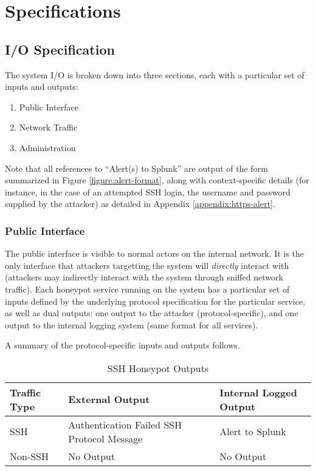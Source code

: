 \chapter{Specifications}

\section{I/O Specification}

The system I/O is broken down into three sections, each with
a particular set of inputs and outputs:

\begin{enumerate}
    \item Public Interface
    \item Network Traffic
    \item Administration
\end{enumerate}

Note that all references to ``Alert(s) to Splunk'' are output of the
form summarized in Figure \ref{figure:alert-format}, along with
context-specific details (for instance, in the case of an attempted SSH
login, the username and password supplied by the attacker) as detailed in
Appendix \ref{appendix:https-alert}.

\subsection{Public Interface}

The public interface is visible to normal actors on the internal network.
It is the only interface that attackers targetting the system will
\textit{directly} interact with (attackers may indirectly interact with
the system through sniffed network traffic). Each honeypot service running
on the system has a particular set of inputs defined by the underlying
protocol specification for the particular service, as well as dual
outputs: one output to the attacker (protocol-specific), and one output
to the internal logging system (same format for all services).

A summary of the protocol-specific inputs and outputs follows.

\begin{table}
\centering
\begin{tabular}{l l l}
Traffic Type & External Output & Internal Logged Output \\
\hline
SSH & Authentication Failed SSH Protocol Message & Alert to Splunk \\
Non-SSH & No Output & No Output \\
\end{tabular}
\caption{SSH Honeypot Outputs}
\label{table:ssh-output}
\end{table}


